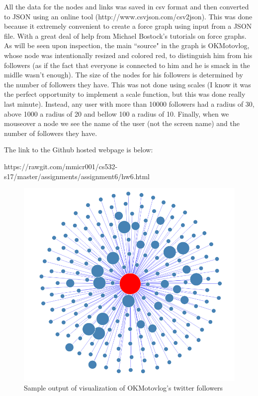 \documentclass{article}
\begin{document}
All the data for the nodes and links was saved in csv format and then converted to JSON using an online tool (http://www.csvjson.com/csv2json). This was done because it extremely convenient to create a force graph using input from a JSON file. With a great deal of help from Michael Bostock's tutorials on force graphs. As will be seen upon inspection, the main ``source" in the graph is OKMotovlog, whose node was intentionally resized and colored red, to distinguish him from his followers (as if the fact that everyone is connected to him and he is smack in the midlle wasn't enough). The size of the nodes for his followers is determined by the number of followers they have. This was not done using scales (I know it was the perfect opportunity to implement a scale function, but this was done really last minute). Instead, any user with more than 10000 followers had a radius of 30, above 1000 a radius of 20 and bellow 100 a radius of 10. Finally, when we mouseover a node we see the name of the user (not the screen name) and the number of followers they have.

The link to the Github hosted webpage is below:

https://rawgit.com/mmicr001/cs532-s17/master/assignments/assignment6/hw6.html

\begin{figure}[H]
 \centering
 	\includegraphics[height=12 cm]{graph.png}
  \caption{Sample output of visualization of OKMotovlog's twitter followers}
\end{figure}

\end{document}
